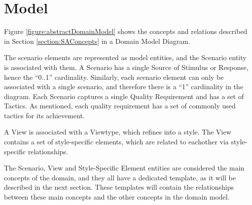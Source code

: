 \section{Model}
\label{section:model}
Figure \ref{figure:abstractDomainModel} shows the concepts and relations described in Section \ref{section:SAConcepts} in a Domain Model Diagram. 

The scenario elements are represented as model entities, and the Scenario entity is associated with them. A Scenario has a single Source of Stimulus or Response, hence the ``0..1'' cardinality. Similarly, each scenario element can only be associated with a single scenario, and therefore there is a ``1'' cardinality in the diagram. Each Scenario captures a single Quality Requirement and has a set of Tactics. As mentioned, each quality requirement has a set of commonly used tactics for its achievement.

A View is associated with a Viewtype, which refines into a style. The View contains a set of style-specific elements, which are related to eachother via style-specific relationships.

The Scenario, View and Style-Specific Element entities are considered the main concepts of the domain, and they all have a dedicated template, as it will be described in the next section. These templates will contain the relationships between these main concepts and the other concepts in the domain model.

